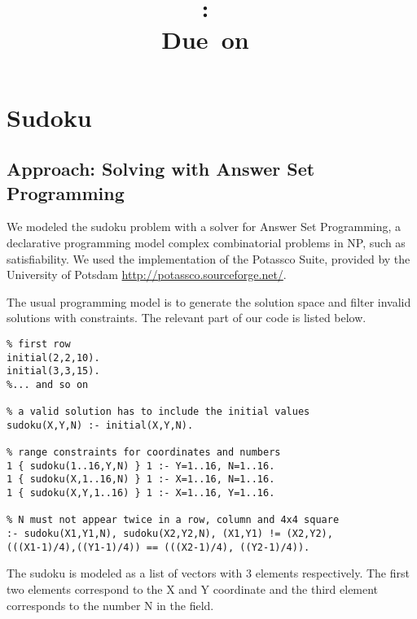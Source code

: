 \documentclass{article}
\title{
\vspace{2in}
\textmd{\textbf{\hmwkClass:\ \hmwkTitle}}\\
\normalsize\vspace{0.1in}\small{Due\ on\ \hmwkDueDate}\\
\vspace{0.1in}\large{\textit{\hmwkClassInstructor}}
\vspace{3in}
}
\author{\textbf{\hmwkAuthorName}}
\date{} %
\begin{document}
\maketitle


\newpage


\section{Sudoku}

\subsection{Approach: Solving with Answer Set Programming}
We modeled the sudoku problem with a solver for Answer Set Programming, a declarative programming model complex combinatorial problems in NP, such as satisfiability.
We used the implementation of the Potassco Suite, provided by the University of Potsdam \url{http://potassco.sourceforge.net/}.

The usual programming model is to generate the solution space and filter invalid solutions with constraints.
The relevant part of our code is listed below.

\begin{verbatim}
% first row
initial(2,2,10).
initial(3,3,15).
%... and so on

% a valid solution has to include the initial values
sudoku(X,Y,N) :- initial(X,Y,N).

% range constraints for coordinates and numbers
1 { sudoku(1..16,Y,N) } 1 :- Y=1..16, N=1..16.
1 { sudoku(X,1..16,N) } 1 :- X=1..16, N=1..16.
1 { sudoku(X,Y,1..16) } 1 :- X=1..16, Y=1..16.

% N must not appear twice in a row, column and 4x4 square
:- sudoku(X1,Y1,N), sudoku(X2,Y2,N), (X1,Y1) != (X2,Y2),
(((X1-1)/4),((Y1-1)/4)) == (((X2-1)/4), ((Y2-1)/4)).

\end{verbatim}

The sudoku is modeled as a list of vectors with 3 elements respectively.
The first two elements correspond to the X and Y coordinate and the third element corresponds to the number N in the field.
\end{document}
